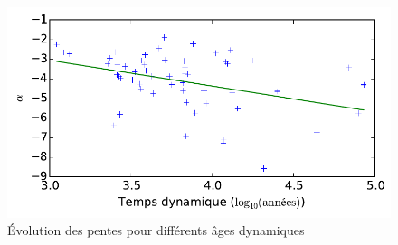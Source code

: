 				\begin{figure}[h!]
					\centering \includegraphics[scale=1.0]{graphe/pente_td.pdf}
					\caption{Évolution des pentes pour différents âges dynamiques}
					\label{Pente-Td-lin}
				\end{figure}


